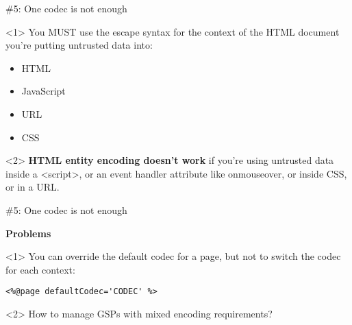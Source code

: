 \begin{frame}

    \vspace{.5cm}

    \begin{center}
      \Huge \#5: One codec is not enough
    \end{center}

    \vspace{1cm}

    \begin{onlyenv}<1>
      You MUST use the escape syntax for the context of the HTML document you're putting untrusted data into:
      \begin{itemize}
        \item HTML
        \item JavaScript
        \item URL
        \item CSS
      \end{itemize}
    \end{onlyenv}

    \begin{onlyenv}<2>
      \textbf{HTML entity encoding doesn't work} if you're using untrusted data inside a <script>, or an event handler attribute like onmouseover, or inside CSS, or in a URL.
    \end{onlyenv}

\end{frame}


\begin{frame}

    \vspace{.5cm}

    \begin{center}
      \Huge \#5: One codec is not enough
    \end{center}

    \vspace{1cm}

    \Large
    \textbf{Problems} \\[1em]

    \begin{onlyenv}<1>
      You can override the default codec for a page, but not to switch the codec for each context:
      \begin{center}
        \begin{minipage}{.9\textwidth}
          \begin{verbatim}
<%@page defaultCodec='CODEC' %>
          \end{verbatim}
        \end{minipage}
      \end{center}
    \end{onlyenv}

    \begin{onlyenv}<2>
      How to manage GSPs with mixed encoding requirements?
    \end{onlyenv}

    \vfill

\end{frame}


